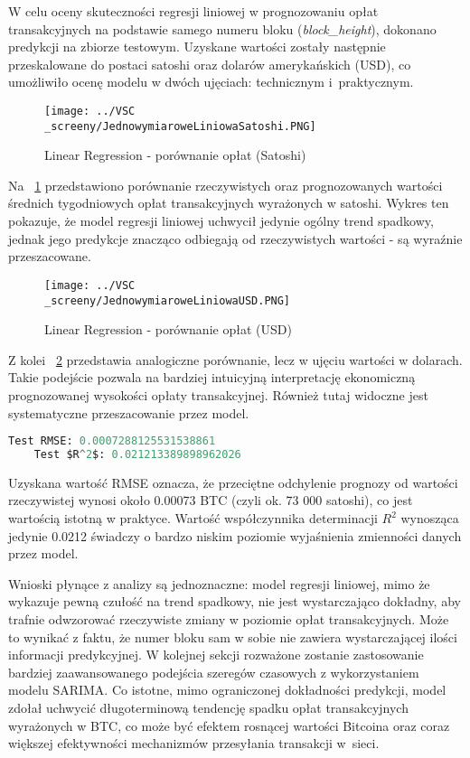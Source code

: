 \documentclass[12pt,a4paper]{report}
\theoremstyle{definition} %
\begin{document}
W celu oceny skuteczności regresji liniowej w prognozowaniu opłat transakcyjnych na podstawie samego numeru bloku (\textit{block\_height}), dokonano predykcji na zbiorze testowym. Uzyskane wartości zostały następnie przeskalowane do postaci satoshi oraz dolarów amerykańskich (USD), co umożliwiło ocenę modelu w dwóch ujęciach: technicznym i~praktycznym.

	\begin{figure}[H]
	    \centering
	    \texttt{[image: ../VSC\\\_screeny/JednowymiaroweLiniowaSatoshi.PNG]} 
	    \caption{Linear Regression - porównanie opłat (Satoshi)}
	    \label{fig:jednowymiarowyLRSathosi}
	\end{figure}

Na \figurename~\ref{fig:jednowymiarowyLRSathosi} przedstawiono porównanie rzeczywistych oraz prognozowanych wartości średnich tygodniowych opłat transakcyjnych wyrażonych w satoshi. Wykres ten pokazuje, że model regresji liniowej uchwycił jedynie ogólny trend spadkowy, jednak jego predykcje znacząco odbiegają od rzeczywistych wartości - są wyraźnie przeszacowane.

	\begin{figure}[H]
	    \centering
	    \texttt{[image: ../VSC\\\_screeny/JednowymiaroweLiniowaUSD.PNG]} 
	    \caption{Linear Regression - porównanie opłat (USD)}
	    \label{fig:jednowymiarowyLRUSD}
	\end{figure}

Z kolei \figurename~\ref{fig:jednowymiarowyLRUSD} przedstawia analogiczne porównanie, lecz w ujęciu wartości w dolarach. Takie podejście pozwala na bardziej intuicyjną interpretację ekonomiczną prognozowanej wysokości opłaty transakcyjnej. Również tutaj widoczne jest systematyczne przeszacowanie przez model.

	\begin{lstlisting}[language=Python,mathescape=true,caption=Wyniki predykcji na zbiorze testowym, label=wynikiJednowymiarowy]
	Test RMSE: 0.0007288125531538861
	Test $R^2$: 0.021213389898962026
	\end{lstlisting}

Uzyskana wartość RMSE oznacza, że przeciętne odchylenie prognozy od wartości rzeczywistej wynosi około 0.00073 BTC (czyli ok. 73 000 satoshi), co jest wartością istotną w praktyce. Wartość współczynnika determinacji  $R^2$ wynosząca jedynie 0.0212 świadczy o bardzo niskim poziomie wyjaśnienia zmienności danych przez model.

Wnioski płynące z analizy są jednoznaczne: model regresji liniowej, mimo że wykazuje pewną czułość na trend spadkowy, nie jest wystarczająco dokładny, aby trafnie odwzorować rzeczywiste zmiany w poziomie opłat transakcyjnych. Może to wynikać z faktu, że numer bloku sam w sobie nie zawiera wystarczającej ilości informacji predykcyjnej. W kolejnej sekcji rozważone zostanie zastosowanie bardziej zaawansowanego podejścia szeregów czasowych z wykorzystaniem modelu SARIMA. Co istotne, mimo ograniczonej dokładności predykcji, model zdołał uchwycić długoterminową tendencję spadku opłat transakcyjnych wyrażonych w BTC, co może być efektem rosnącej wartości Bitcoina oraz coraz większej efektywności mechanizmów przesyłania transakcji w~sieci.
\end{document}
